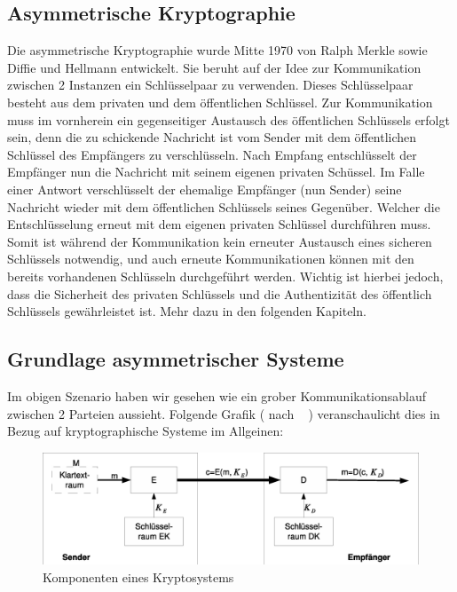 \documentclass[paper=a4,11pt,german]{scrartcl} %
\begin{document}
\subsection{Asymmetrische Kryptographie}
Die asymmetrische Kryptographie wurde Mitte 1970 von Ralph Merkle sowie Diffie und Hellmann entwickelt. Sie beruht auf der Idee zur Kommunikation zwischen 2 Instanzen ein Schlüsselpaar zu verwenden. Dieses Schlüsselpaar besteht aus dem privaten und dem öffentlichen Schlüssel. Zur Kommunikation muss im vornherein ein gegenseitiger Austausch des öffentlichen Schlüssels erfolgt sein, denn die zu schickende Nachricht ist vom Sender mit dem öffentlichen Schlüssel des Empfängers zu verschlüsseln. Nach Empfang entschlüsselt der Empfänger nun die Nachricht mit seinem eigenen privaten Schüssel. Im Falle einer Antwort verschlüsselt der ehemalige Empfänger (nun Sender) seine Nachricht wieder mit dem öffentlichen Schlüssels seines Gegenüber. Welcher die Entschlüsselung erneut mit dem eigenen privaten Schlüssel durchführen muss. Somit ist während der Kommunikation kein erneuter Austausch eines sicheren Schlüssels notwendig, und auch erneute Kommunikationen können mit den bereits vorhandenen Schlüsseln durchgeführt werden. Wichtig ist hierbei jedoch, dass die Sicherheit des privaten Schlüssels und die Authentizität des öffentlich Schlüssels gewährleistet ist. Mehr dazu in den folgenden Kapiteln.
 
\subsection{Grundlage asymmetrischer Systeme}
Im obigen Szenario haben wir gesehen wie ein grober Kommunikationsablauf zwischen 2 Parteien aussieht. Folgende Grafik ( nach ~\cite{Eckert13} ) veranschaulicht dies in Bezug auf kryptographische Systeme im Allgeinen:
\begin{figure}[htb]
	\centering
	\includegraphics[width=\textwidth]{async.eps}
	\caption{Komponenten eines Kryptosystems}
	\label{fig:sim}
\end{figure}
\end{document}
